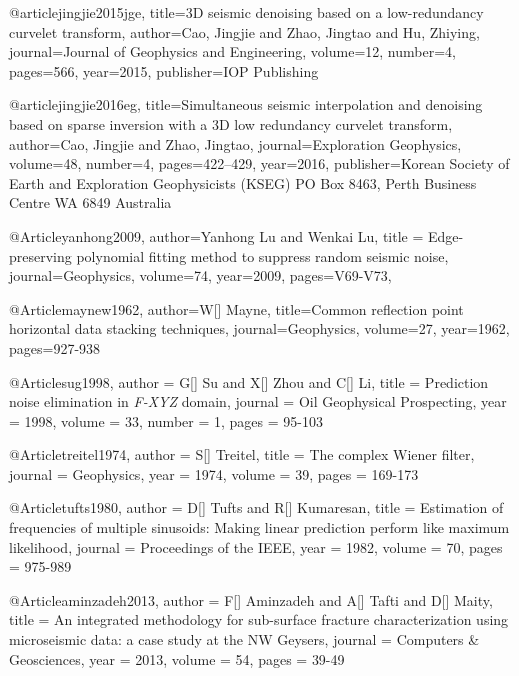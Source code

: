 @article{jingjie2015jge,
  title={3{D} seismic denoising based on a low-redundancy curvelet transform},
  author={Cao, Jingjie and Zhao, Jingtao and Hu, Zhiying},
  journal={Journal of Geophysics and Engineering},
  volume={12},
  number={4},
  pages={566},
  year={2015},
  publisher={IOP Publishing}
}

@article{jingjie2016eg,
  title={Simultaneous seismic interpolation and denoising based on sparse inversion with a 3{D} low redundancy curvelet transform},
  author={Cao, Jingjie and Zhao, Jingtao},
  journal={Exploration Geophysics},
  volume={48},
  number={4},
  pages={422--429},
  year={2016},
  publisher={Korean Society of Earth and Exploration Geophysicists (KSEG) PO Box 8463, Perth Business Centre WA 6849 Australia}
}













@Article{yanhong2009,
  author={Yanhong Lu and Wenkai Lu},
  title ={ Edge-preserving polynomial fitting method to suppress random seismic noise},
  journal={Geophysics},
  volume=74,
  year=2009,
  pages={V69-V73},
}

@Article{maynew1962,
author={W[] Mayne},
title={Common reflection point horizontal data stacking techniques},
journal={Geophysics},
volume=27,
year=1962,
pages={927-938}
}

@Article{sug1998,
  author = 	 {G[] Su and X[] Zhou and C[] Li},
  title = 	 { Prediction noise elimination in \emph{F-XYZ} domain},
  journal = 	 { Oil Geophysical Prospecting},
  year = 	 1998,
  volume = 	 33,
  number = 	 1,
  pages = 	 {95-103}}

@Article{treitel1974,
  author = 	 {S[] Treitel},
  title = 	 {The complex Wiener filter},
  journal = 	 { Geophysics},
  year = 	 1974,
  volume = 	 39,
  pages = 	 {169-173}}

@Article{tufts1980,
  author = 	 {D[] Tufts and R[] Kumaresan},
  title = 	 {Estimation of frequencies of multiple sinusoids: Making linear prediction perform like maximum likelihood},
  journal = 	 { Proceedings of the IEEE},
  year = 	 1982,
  volume = 	 70,
  pages = 	 {975-989}}

@Article{aminzadeh2013,
  author = 	 {F[] Aminzadeh and A[] Tafti and D[] Maity},
  title = 	 {An integrated methodology for sub-surface fracture characterization using microseismic data: a case study at the NW {G}eysers},
  journal = 	 { Computers \& Geosciences},
  year = 	 2013,
  volume = 	 54,
  pages = 	 {39-49}}

